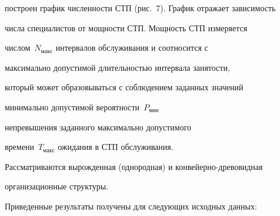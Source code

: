 построен график численности СТП (рис.~7). График отражает зависимость 


числа специалистов от мощности СТП. Мощность СТП измеряется 


числом~$N_{\mathrm{макс}}$ интервалов обслуживания и соотносится с 


мак\-си\-маль\-но до\-пус\-ти\-мой длительностью интервала занятости, 


который может образовываться с соблюдением заданных значений 


ми\-ни\-маль\-но до\-пус\-ти\-мой вероятности~$P_{\mathrm{мин}}$ 


непревышения заданного максимально допустимого 


времени~$T_{\mathrm{макс}}$ ожидания в СТП обслуживания. 


Рассматриваются вырожденная (однородная) и конвейерно-древовидная 


организационные структуры. 





Приведенные результаты получены для следующих исходных данных:


